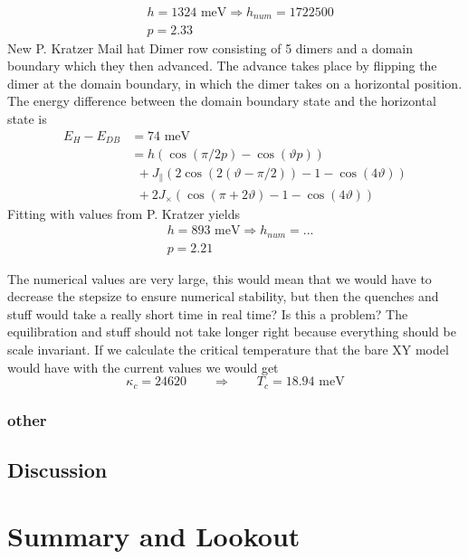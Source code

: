 	\begin{align}
		&h =	1324 \text{ meV} \Rightarrow h_{num} =	 1722500 \\
		&p =	2.33
	\end{align}
	New P. Kratzer Mail hat Dimer row consisting of 5 dimers and a domain boundary which they then advanced. The advance takes place by flipping the dimer at the domain boundary, in which the dimer takes on a horizontal position. The energy difference between the domain boundary state and the horizontal state is
	\begin{equation}
		\begin{split}
			E_H - E_{DB} &=	74 \text{ meV} \\
			&=	h \left(\cos(\pi /	2 p) - \cos(\vartheta p)\right) \\
			&~~+J_\parallel \left(2 \cos ( 2 (\vartheta - \pi / 2)) -1 - \cos(4 \vartheta)\right) \\
			&~~+2 J_\times \left(\cos(\pi + 2 \vartheta) - 1 - \cos(4 \vartheta) \right)
		\end{split}
	\end{equation}
	Fitting with values from P. Kratzer yields
	\begin{align}
		&h =	893 \text{ meV} \Rightarrow h_{num} = ...	 \\
		&p =	2.21
	\end{align}
	
	The numerical values are very large, this would mean that we would have to decrease the stepsize to ensure numerical stability, but then the quenches and stuff would take a really short time in real time? Is this a problem? The equilibration and stuff should not take longer right because everything should be scale invariant. If we calculate the critical temperature that the bare XY model would have with the current values we would get
	\begin{equation}
		\kappa_c = 24620 \qquad \Rightarrow \qquad T_c =	18.94\text{ meV}
	\end{equation}
	\subsection{other}
	\section{Discussion}
	\chapter{Summary and Lookout} \label{Chapter::Summary-Lookout}
